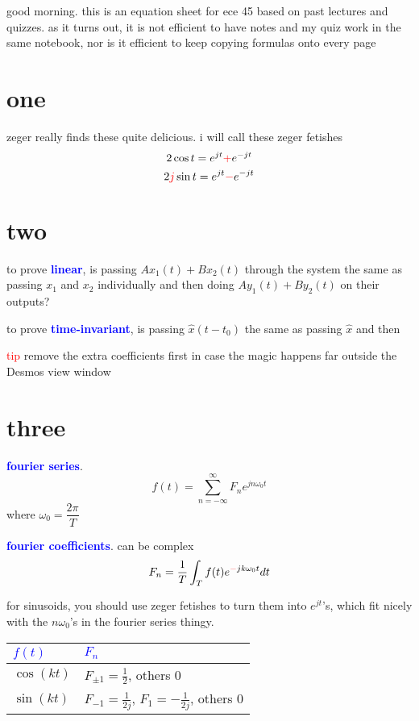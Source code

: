 \documentclass[a5paper, fleqn]{article}
\newcommand{\vocab}[1]{\textbf{\textcolor{blue}{#1}}}
\newcommand{\emf}[1]{\textcolor{red}{#1}}
\newcommand{\wrap}{\hangpara{0.5cm}{1}}
\begin{document}
good morning. this is an equation sheet for ece 45 based on past lectures and quizzes. as it turns out, it is not efficient to have notes and my quiz work in the same notebook, nor is it efficient to keep copying formulas onto every page

\section*{\textcolor{primary}{one}}

zeger really finds these quite delicious. i will call these zeger fetishes
\[2 \cos t = e^{jt} \emf{+} e^{-jt}\]
\[2\emf{j} \sin t = e^{jt} \emf{-} e^{-jt}\]

\section*{\textcolor{primary}{two}}

\wrap to prove \vocab{linear}, is passing $Ax_1(t) + Bx_2(t)$ through the system the same as passing $x_1$ and $x_2$ individually and then doing $Ay_1(t) + By_2(t)$ on their outputs?

\wrap to prove \vocab{time-invariant}, is passing $\hat{x}(t - t_0)$ the same as passing $\hat{x}$ and then

\wrap \emf{tip} remove the extra coefficients first in case the magic happens far outside the Desmos view window

\section*{\textcolor{primary}{three}}

\vocab{fourier series}.
\[f(t) = \sum_{n = -\infty}^{\infty} F_n e^{jn\omega_0 t}\]
where $\omega_0 = \dfrac{2\pi}{T}$

\vocab{fourier coefficients}. can be complex
\[F_n = \frac{1}{T} \int_T f(t) e^{\emf{-}jk\omega_0 t} dt\]

\wrap for sinusoids, you should use zeger fetishes to turn them into $e^{jt}$'s, which fit nicely with the $n\omega_0$'s in the fourier series thingy.

\begin{tabular}{l | l}
  \vocab{$f(t)$} & \vocab{$F_n$}                                              \\
  \hline
  $\cos (kt)$    & $F_{\pm 1} = \frac{1}{2}$, others $0$                      \\
  $\sin (kt)$    & $F_{-1} = \frac{1}{2j}$, $F_1 = -\frac{1}{2j}$, others $0$
\end{tabular}
\end{document}
